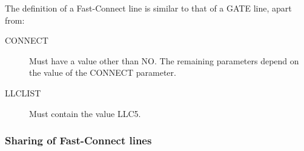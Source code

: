 \documentclass[letterpaper,10pt,english]{sphinxmanual}
\begin{document}
The definition of a Fast-Connect line is similar to that of a GATE line, apart from:

\begin{description}
\item[{CONNECT}] \leavevmode
Must have a value other than NO. The remaining parameters depend on
the value of the CONNECT parameter.

\item[{LLCLIST}] \leavevmode
Must contain the value LLC5.

\end{description}


\subsubsection{Sharing of Fast-Connect lines}
\label{\detokenize{connectivity_guide:sharing-of-fast-connect-lines}}
\end{document}
